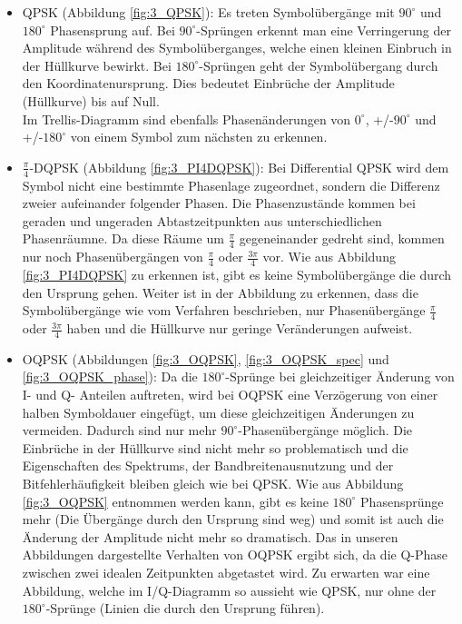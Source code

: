 \documentclass[12pt,a4paper,ngerman]{article}
\begin{document}
\begin{itemize}
\item QPSK (Abbildung \ref{fig:3_QPSK}): Es treten Symbolübergänge mit $90^\circ$ und $180^\circ$ Phasensprung auf. Bei $90^\circ$-Sprüngen erkennt man eine Verringerung der Amplitude während des Symbolüberganges, welche einen kleinen Einbruch in der Hüllkurve bewirkt. Bei $180^\circ$-Sprüngen geht der Symbolübergang durch den Koordinatenursprung. Dies bedeutet Einbrüche der Amplitude (Hüllkurve) bis auf Null.\\
Im Trellis-Diagramm sind ebenfalls Phasenänderungen von $0^\circ$, +/-$90^\circ$ und +/-$180^\circ$ von einem Symbol zum nächsten zu erkennen.
\item $\frac{\pi}{4}$-DQPSK (Abbildung \ref{fig:3_PI4DQPSK}): Bei Differential QPSK wird dem Symbol nicht eine bestimmte Phasenlage zugeordnet, sondern die Differenz zweier aufeinander folgender Phasen. Die Phasenzustände kommen bei geraden und ungeraden Abtastzeitpunkten aus unterschiedlichen Phasenräumne. Da diese Räume um  $\frac{\pi}{4}$ gegeneinander gedreht sind, kommen nur noch Phasenübergängen von  $\frac{\pi}{4}$ oder  $\frac{3\pi}{4}$ vor. Wie aus Abbildung \ref{fig:3_PI4DQPSK} zu erkennen ist, gibt es keine Symbolübergänge die durch den Ursprung gehen. Weiter ist in der Abbildung zu erkennen, dass die Symbolübergänge wie vom Verfahren beschrieben, nur Phasenübergänge $\frac{\pi}{4}$ oder  $\frac{3\pi}{4}$ haben und die Hüllkurve nur geringe Veränderungen aufweist. 
\item OQPSK (Abbildungen \ref{fig:3_OQPSK}, \ref{fig:3_OQPSK_spec} und \ref{fig:3_OQPSK_phase}): Da die $180^\circ$-Sprünge bei gleichzeitiger Änderung von I- und Q- Anteilen auftreten, wird bei OQPSK eine Verzögerung von einer halben Symboldauer eingefügt, um diese gleichzeitigen Änderungen zu vermeiden. Dadurch sind nur mehr $90^\circ$-Phasenübergänge möglich. Die Einbrüche in der Hüllkurve sind nicht mehr so problematisch und die Eigenschaften des Spektrums, der Bandbreitenausnutzung und der Bitfehlerhäufigkeit bleiben gleich wie bei QPSK. Wie aus Abbildung \ref{fig:3_OQPSK} entnommen werden kann, gibt es keine $180^\circ$ Phasensprünge mehr (Die Übergänge durch den Ursprung sind weg) und somit ist auch die Änderung der Amplitude nicht mehr so dramatisch. Das in unseren Abbildungen dargestellte Verhalten von OQPSK ergibt sich, da die Q-Phase zwischen zwei idealen Zeitpunkten abgetastet wird. Zu erwarten war eine Abbildung, welche im I/Q-Diagramm so aussieht wie QPSK, nur ohne der $180^\circ$-Sprünge (Linien die durch den Ursprung führen).

\end{itemize}
\end{document}
